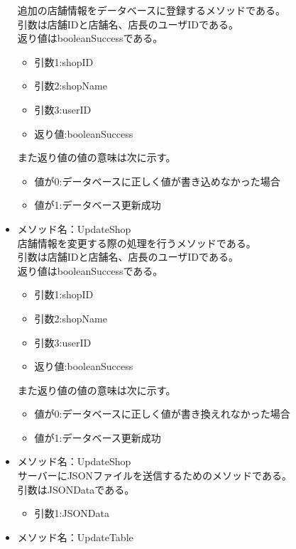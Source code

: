 \documentclass[a4j]{jarticle}
\begin{document}
\begin{itemize}
追加の店舗情報をデータベースに登録するメソッドである。\\
引数は店舗IDと店舗名、店長のユーザIDである。\\
返り値はbooleanSuccessである。
	\begin{itemize}
		\item 引数1:shopID
		\item 引数2:shopName
		\item 引数3:userID
		\item 返り値:booleanSuccess
	\end{itemize}
また返り値の値の意味は次に示す。
	\begin{itemize}
		\item 値が0:データベースに正しく値が書き込めなかった場合
		\item 値が1:データベース更新成功
	\end{itemize}


\item メソッド名：UpdateShop\\

店舗情報を変更する際の処理を行うメソッドである。\\
引数は店舗IDと店舗名、店長のユーザIDである。\\
返り値はbooleanSuccessである。
	\begin{itemize}
		\item 引数1:shopID
		\item 引数2:shopName
		\item 引数3:userID
		\item 返り値:booleanSuccess
	\end{itemize}
また返り値の値の意味は次に示す。
	\begin{itemize}
		\item 値が0:データベースに正しく値が書き換えれなかった場合
		\item 値が1:データベース更新成功
	\end{itemize}

\item メソッド名：UpdateShop\\

サーバーにJSONファイルを送信するためのメソッドである。\\
引数はJSONDataである。
	\begin{itemize}
		\item 引数1:JSONData
	\end{itemize}

\item メソッド名：UpdateTable\\


\end{itemize}
\end{document}
